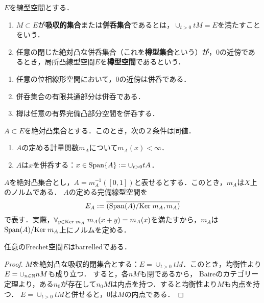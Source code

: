 \documentclass[uplatex,dvipdfmx]{jsreport}
\begin{document}
\begin{definition}\label{def-barrel}
    $E$を線型空間とする．
    \begin{enumerate}
        \item $M\subset E$が\textbf{吸収的集合}または\textbf{併呑集合}であるとは，$\cup_{t>0}tM=E$を満たすことをいう．
        \item 任意の閉じた絶対凸な併呑集合（これを\textbf{樽型集合}という）が，$0$の近傍であるとき，局所凸線型空間$E$を\textbf{樽型空間}であるという．
    \end{enumerate}
\end{definition}

\begin{lemma}\mbox{}
    \begin{enumerate}
        \item 任意の位相線形空間において，$0$の近傍は併呑である．
        \item 併呑集合の有限共通部分は併呑である．
        \item 樽は任意の有界完備凸部分空間を併呑する．
    \end{enumerate}
\end{lemma}

\begin{lemma}[併呑性の特徴付け]\label{lemma-characterizing-absorbant}
    $A\subset E$を絶対凸集合とする．このとき，次の２条件は同値．
    \begin{enumerate}
        \item $A$の定める計量関数$m_A$について$m_A(x)<\infty$．
        \item $A$は$x$を併呑する：$x\in\mathrm{Span}\{A\}:=\cup_{t>0}tA$．
    \end{enumerate}
\end{lemma}

\begin{notation}
    $A$を絶対凸集合とし，$A=m_A^{-1}([0,1])$と表せるとする．このとき，$m_A$は$X$上のノルムである．
    $A$の定める完備線型空間を
    \[E_A:=\overline{\left(\mathrm{Span}(A)/\mathrm{Ker}\; m_A,m_A\right)}\]
    で表す．実際，$\forall_{y\in\mathrm{Ker}\; m_A}\;m_A(x+y)=m_A(x)$を満たすから，$m_A$は$\mathrm{Span}(A)/\mathrm{Ker}\; m_A$上にノルムを定める．
\end{notation}

\begin{proposition}
    任意のFrechet空間$E$はbarrelledである．
\end{proposition}
\begin{proof}
    $M$を絶対凸な吸収的閉集合とする：$E=\cup_{t>0}tM$．このとき，均衡性より$E=\cup_{n\in\mathbb{N}}nM$も成り立つ．
    すると，各$nM$も閉であるから，
    Baireのカテゴリー定理より，ある$n_0$が存在して$n_0M$は内点を持つ．すると均衡性より$M$も内点を持つ．
    $E=\cup_{t>0}tM$と併せると，$0$は$M$の内点である．
\end{proof}
\end{document}
